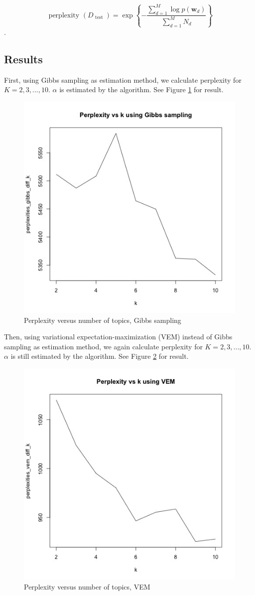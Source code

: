\documentclass{article}
\begin{document}
$$
\text { perplexity }\left(D_{\text { test }}\right)=\exp \left\{-\frac{\sum_{d=1}^{M} \log p\left(\mathbf{w}_{d}\right)}{\sum_{d=1}^{M} N_{d}}\right\}
$$.


\subsection{Results}

First, using Gibbs sampling as estimation method, we calculate perplexity for $K = 2, 3, ..., 10$. $\alpha$ is estimated by the algorithm. See Figure \ref{fig:gibbs_diff_k_10} for result.

\begin{figure}[h]
  \centering
  \includegraphics[width=0.5\linewidth]{images/gibbs_diff_k.jpg}
  \caption{Perplexity versus number of topics, Gibbs sampling}
  \label{fig:gibbs_diff_k_10}
\end{figure}

Then, using variational expectation-maximization (VEM) instead of Gibbs sampling as estimation method, we again calculate perplexity for $K = 2, 3, ..., 10$. $\alpha$ is still estimated by the algorithm. See Figure \ref{fig:vem_diff_k_10} for result.

\begin{figure}[h]
  \centering
  \includegraphics[width=0.5\linewidth]{images/vem_diff_k.jpg}
  \caption{Perplexity versus number of topics, VEM}
  \label{fig:vem_diff_k_10}
\end{figure}
\end{document}
